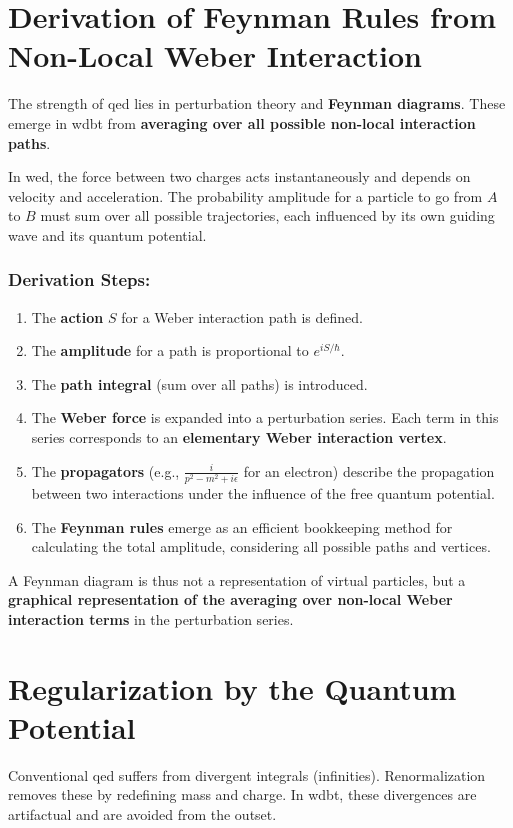 \section{Derivation of Feynman Rules from Non-Local Weber Interaction}
The strength of \gls{qed} lies in perturbation theory and \textbf{Feynman diagrams}. These emerge in \gls{wdbt} from \textbf{averaging over all possible non-local interaction paths}.

In \gls{wed}, the force between two charges acts instantaneously and depends on velocity and acceleration. The probability amplitude for a particle to go from $A$ to $B$ must sum over all possible trajectories, each influenced by its own guiding wave and its quantum potential.

\subsubsection{Derivation Steps:}
\begin{enumerate}
    \item The \textbf{action} $S$ for a Weber interaction path is defined.
    \item The \textbf{amplitude} for a path is proportional to $e^{iS/\hbar}$.
    \item The \textbf{path integral} (sum over all paths) is introduced.
    \item The \textbf{Weber force} is expanded into a perturbation series. Each term in this series corresponds to an \textbf{elementary Weber interaction vertex}.
    \item The \textbf{propagators} (e.g., $\frac{i}{p^2 - m^2 + i\epsilon}$ for an electron) describe the propagation between two interactions under the influence of the free quantum potential.
    \item The \textbf{Feynman rules} emerge as an efficient bookkeeping method for calculating the total amplitude, considering all possible paths and vertices.
\end{enumerate}

A Feynman diagram is thus not a representation of virtual particles, but a \textbf{graphical representation of the averaging over non-local Weber interaction terms} in the perturbation series.

\section{Regularization by the Quantum Potential}
Conventional \gls{qed} suffers from divergent integrals (infinities). Renormalization removes these by redefining mass and charge. In \gls{wdbt}, these divergences are artifactual and are avoided from the outset.


